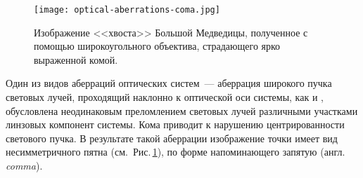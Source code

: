 \begin{figure}
	\centering
	\vspace{-1pc}
	\texttt{[image: optical-aberrations-coma.jpg]}
	\caption{Изображение <<хвоста>> Большой Медведицы, полученное с помощью широкоугольного объектива, страдающего ярко выраженной комой.}
	\label{pic:optics-aberrations-coma}
\end{figure}
Один из видов аберраций оптических систем~--- аберрация широкого пучка световых лучей, проходящий наклонно к оптической оси системы, как и , обусловлена неодинаковым преломлением световых лучей различными участками линзовых компонент системы. Кома приводит к нарушению центрированности светового пучка. В результате такой аберрации изображение точки имеет вид несимметричного пятна (см.~Рис.\,\ref{pic:optics-aberrations-coma}), по форме напоминающего запятую (англ. {\itshape comma}).

